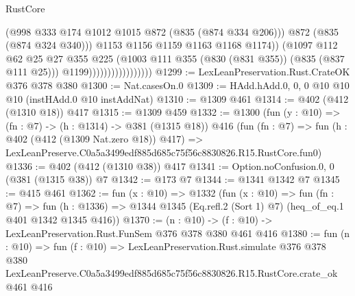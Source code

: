 \begin{lexlean}{RustCore}
\begin{coremodule}
                                          (@998 @333 @174 @1012 @1015 @872 (@835 (@874 @334 @206)))
                                          @872
                                          (@835 (@874 @324 @340)))
                                        @1153
                                        @1156
                                        @1159
                                        @1163
                                        @1168
                                        @1174))
                                    (@1097
                                      @112
                                      @62
                                      @25
                                      @27
                                      @355
                                      @225
                                      (@1003 @111 @355 (@830 (@831 @355)) (@835 (@837 @111 @25)))
                                      @1199)))))))))))))))))
@1299 := LexLeanPreservation.Rust.CrateOK @376 @378 @380
@1300 := Nat.casesOn.{0}
@1309 := HAdd.hAdd.{0, 0, 0} @10 @10 @10 (instHAdd.{0} @10 instAddNat)
@1310 := @1309 @461
@1314 := @402 (@412 (@1310 @18)) @417
@1315 := @1309 @459
@1332 := @1300
    (fun (y : @10) => (fn : @7) -> (h : @1314) -> @381 (@1315 @18))
    @416
    (fun (fn : @7) =>
    fun (h : @402 (@412 (@1309 Nat.zero @18)) @417) =>
    LexLeanPreserve.C0a5a3499edf885d685c75f56c8830826.R15.RustCore.fun0)
@1336 := @402 (@412 (@1310 @38)) @417
@1341 := Option.noConfusion.{0, 0} (@381 (@1315 @38)) @7
@1342 := @173 @7
@1344 := @1341 @1342 @7
@1345 := @415 @461
@1362 := fun (x : @10) =>
  @1332
    (fun (x : @10) =>
    fun (fn : @7) =>
    fun (h : @1336) => @1344 @1345 (Eq.refl.{2} (Sort 1) @7) (heq_of_eq.{1} @401 @1342 @1345 @416))
@1370 := (n : @10) -> (f : @10) -> LexLeanPreservation.Rust.FunSem @376 @378 @380 @461 @416
@1380 := fun (n : @10) =>
  fun (f : @10) =>
  LexLeanPreservation.Rust.simulate
    @376
    @378
    @380
    LexLeanPreserve.C0a5a3499edf885d685c75f56c8830826.R15.RustCore.crate_ok
    @461
    @416
\end{coremodule}
\end{lexlean}
